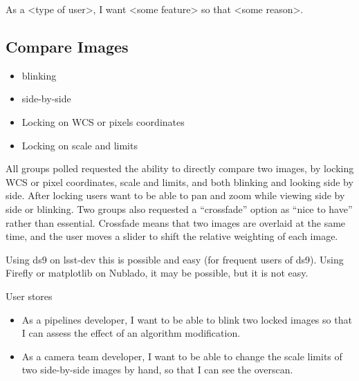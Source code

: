 

As a <type of user>, I want <some feature> so that <some reason>. 

\subsection{Compare Images}
\begin{itemize}
\item{blinking}
\item{side-by-side}
\item{Locking on WCS or pixels coordinates}
\item{Locking on scale and limits}
\end{itemize}

All groups polled requested the ability to directly compare two images, by locking WCS or pixel coordinates, scale and limits, and both blinking and looking side by side.
After locking users want to be able to pan and zoom while viewing side by side or blinking.
Two groups also requested a ``crossfade'' option as ``nice to have'' rather than essential.
Crossfade means that two images are overlaid at the same time, and the user moves a slider to shift the relative weighting of each image.

Using ds9 on lsst-dev this is possible and easy (for frequent users of ds9).
Using Firefly or matplotlib on Nublado, it may be possible, but it is not easy.

User stores
\begin{itemize}
\item{As a pipelines developer,  I want to be able to blink two locked images so that I can assess the effect of an algorithm modification.}
\item{As a camera team developer,  I want to be able to change the scale limits of two side-by-side images by hand, so that I can see the overscan.}
\end{itemize}

